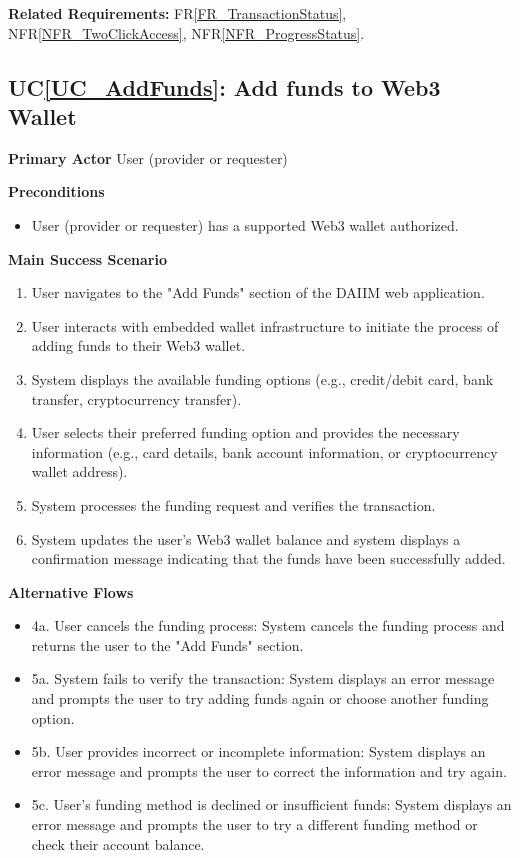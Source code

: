 \documentclass[12pt]{article}
\newcounter{ucnum} %
\newcommand{\ucref}[1]{UC\ref{#1}}
\newcommand{\rref}[1]{FR\ref{#1}}
\newcommand{\nfrref}[1]{NFR\ref{#1}}
\begin{document}
\textbf{Related Requirements:} \rref{FR_TransactionStatus}, \nfrref{NFR_TwoClickAccess}, \nfrref{NFR_ProgressStatus}.


 \label{UC_AddFunds}
\subsection{\ucref{UC_AddFunds}: Add funds to Web3 Wallet}

\textbf{Primary Actor}
User (provider or requester)

\textbf{Preconditions}
\begin{itemize}
\item User (provider or requester) has a supported Web3 wallet authorized.
\end{itemize}

\textbf{Main Success Scenario}
\begin{enumerate}
\item User navigates to the "Add Funds" section of the DAIIM web application.
\item User interacts with embedded wallet infrastructure to initiate the process of adding funds to their Web3 wallet.
\item System displays the available funding options (e.g., credit/debit card, bank transfer, cryptocurrency transfer).
\item User selects their preferred funding option and provides the necessary information (e.g., card details, bank account information, or cryptocurrency wallet address).
\item System processes the funding request and verifies the transaction.
\item System updates the user's Web3 wallet balance and system displays a confirmation message indicating that the funds have been successfully added.
\end{enumerate}

\textbf{Alternative Flows}
\begin{itemize}
\item 4a. User cancels the funding process: System cancels the funding process and returns the user to the "Add Funds" section.
\item 5a. System fails to verify the transaction: System displays an error message and prompts the user to try adding funds again or choose another funding option.
\item 5b. User provides incorrect or incomplete information: System displays an error message and prompts the user to correct the information and try again.
\item 5c. User's funding method is declined or insufficient funds: System displays an error message and prompts the user to try a different funding method or check their account balance.

\end{itemize}
\end{document}
